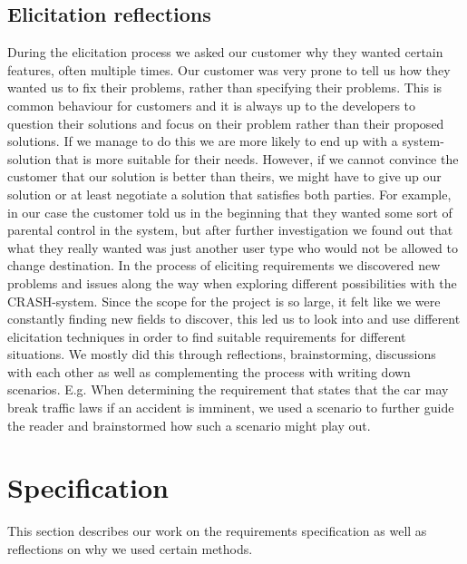 \documentclass[10pt]{article}
\begin{document}
\subsection{Elicitation reflections}
During the elicitation process we asked our customer why they wanted certain features, often multiple times. Our customer was very prone to tell us how they wanted us to fix their problems, rather than specifying their problems. This is common behaviour for customers and it is always up to the developers to question their solutions and focus on their problem rather than their proposed solutions. If we manage to do this we are more likely to end up with a system-solution that is more suitable for their needs. However, if we cannot convince the customer that our solution is better than theirs, we might have to give up our solution or at least negotiate a solution that satisfies both parties.
For example, in our case the customer told us in the beginning that they wanted some sort of parental control in the system, but after further investigation we found out that what they really wanted was just another user type who would not be allowed to change destination.
\newline
\indent In the process of eliciting requirements we discovered new problems and issues along the way when exploring different possibilities with the CRASH-system. Since the scope for the project is so large, it felt like we were constantly finding new fields to discover, this led us to look into and use different elicitation techniques in order to find suitable requirements for different situations. We mostly did this through reflections, brainstorming, discussions with each other as well as complementing the process with writing down scenarios. E.g. When determining the requirement that states that the car may break traffic laws if an accident is imminent, we used a scenario to further guide the reader and brainstormed how such a scenario might play out.

\section{Specification}
This section describes our work on the requirements specification as well as reflections on why we used certain methods. 
\end{document}
